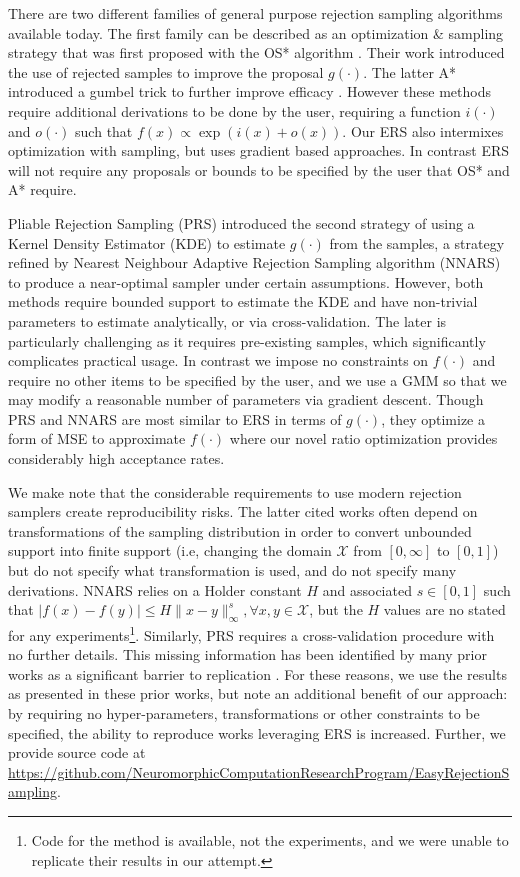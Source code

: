 \documentclass{ecai}  %
\begin{document}
There are two different families of general purpose rejection sampling algorithms available today. The first family can be described as an optimization \& sampling strategy that was first proposed with the OS* algorithm \cite{Jul2021}. Their work introduced the use of rejected samples to improve the proposal $g(\cdot)$. The latter A* introduced a gumbel trick to further improve efficacy \cite{NIPS2014_309fee4e}. However these methods require additional derivations to be done by the user, requiring a function $i(\cdot)$ and $o(\cdot)$ such that $f(x) \propto \exp (i(x)+o(x))$. Our ERS also intermixes optimization with sampling, but uses gradient based approaches. In contrast ERS will not require any proposals or bounds to be specified by the user that OS* and A* require. 

Pliable Rejection Sampling (PRS) \cite{10.5555/3045390.3045614} introduced the second strategy of using a Kernel Density Estimator (KDE) to estimate $g(\cdot)$ from the samples, a strategy refined by Nearest Neighbour Adaptive Rejection Sampling algorithm (NNARS) \cite{pmlr-v98-achddou19a} to produce a near-optimal sampler under certain assumptions. However, both methods require bounded support to estimate the KDE and have non-trivial parameters to estimate analytically, or via cross-validation. The later is particularly challenging as it requires pre-existing samples, which significantly complicates practical usage. In contrast we impose no constraints on $f(\cdot)$ and require no other items to be specified by the user, and we use a GMM so that we may modify a reasonable number of parameters via gradient descent. Though PRS and NNARS are most similar to ERS in terms of $g(\cdot)$, they optimize a form of MSE to approximate $f(\cdot)$ where our novel ratio optimization provides considerably high acceptance rates.

We make note that the considerable requirements to use modern rejection samplers create reproducibility risks. The latter cited works often depend on transformations of the sampling distribution in order to convert unbounded support into finite support (i.e, changing the domain $\mathcal{X}$ from $[0, \infty]$ to $[0, 1]$) but do not specify what transformation is used, and do not specify many derivations.  NNARS relies on a Holder constant $H$ and associated $s \in [0, 1]$ such that $|f(x)-f(y)| \leq H\|x-y\|_{\infty}^{s}, \forall x, y \in \mathcal{X}$, but the $H$ values are no stated for any experiments\footnote{Code for the method is available, not the experiments, and we were unable to replicate their results in our attempt.}. Similarly, PRS requires a cross-validation procedure with no further details. This missing information has been identified by many prior works as a significant barrier to replication \cite{Dodge2019,Gundersen2018,Musgrave2020,Raff2019_quantify_repro,Raff2020c,10.1145/3589806.3600041,10.1145/3589806.3600042}. For these reasons, we use the results as presented in these prior works, but note an additional benefit of our approach: by requiring no hyper-parameters, transformations or other constraints to be specified, the ability to reproduce works leveraging ERS is increased. Further, we provide source code at \url{https://github.com/NeuromorphicComputationResearchProgram/EasyRejectionSampling}. 
\end{document}
